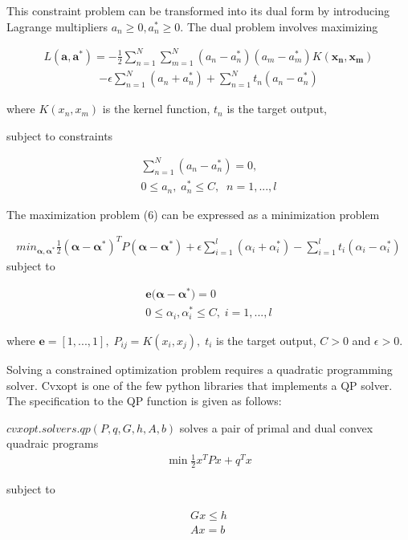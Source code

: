 \documentclass[12pt,twoside,notitlepage]{report}
\begin{document}
This constraint problem can be transformed into its dual form  by introducing Lagrange multipliers 
\(a_n \geq 0, a_n^* \geq 0\).
The dual problem involves maximizing

\begin{gather}
  L(\mathbf{a},\mathbf{a^*}) = -\frac{1}{2}\sum_{n=1}^{N}\sum_{m=1}^{N}(a_n-a_n^*)(a_m-a_m^*)K(\mathbf{x_n},\mathbf{x_m})
\end{gather}
\begin{gather*}
  -\epsilon\sum_{n=1}^{N}(a_n+a_n^*) + \sum_{n=1}^{N}t_n(a_n-a_n^*)
 \end{gather*}

where \(K(x_n,x_m) \) is the kernel function, \(t_n\) is the target output,

subject to constraints

\begin{gather}
  \sum_{n=1}^{N}(a_n-a_n^*)=0,\\
  0\leq a_n,\; a_n^*\leq C,\;\;    n=1,...,l 
\end{gather}


The maximization problem (6) can be expressed as a minimization problem

\begin{gather}
  min_{\bm{\alpha},\bm{\alpha^*}} \frac{1}{2}(\bm{\alpha-\alpha^*})^T P (\bm{\alpha - \alpha^*})+\epsilon 
\sum_{i=1}^{l}(\alpha_i+\alpha_i^*)-\sum_{i=1}^{l}t_i(\alpha_i-\alpha_i^*)
\end{gather}
subject to

\begin{gather}
  \mathbf{e(\bm{\alpha}}-\bm{\alpha^*})=0 \\
  0\leq \alpha_i,\alpha_i^* \leq C, \;i=1,...,l
 \end{gather}

where
\(\mathbf{e}=[1,...,1],\;P_{ij}=K(x_i,x_j),\;t_i\) is the target output, \(C > 0\) and \(\epsilon > 0.\)

Solving a constrained optimization problem requires a quadratic programming solver. Cvxopt is one of the few python
libraries that implements a QP solver. The specification to the QP function is given as follows:

\(cvxopt.solvers.qp(P,q,G,h,A,b)\) solves a pair of primal and dual convex quadraic programs
\begin{gather}
  \min \frac{1}{2} x^T P x + q^T x
\end{gather}

 subject to

\begin{gather}
 G x \leq h\\
  Ax = b
\end{gather}
\end{document}
